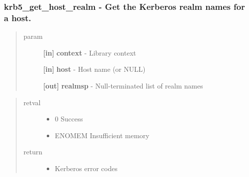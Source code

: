 \documentclass[letterpaper,10pt,english]{sphinxmanual}
\begin{document}
\subsubsection{krb5\_get\_host\_realm -  Get the Kerberos realm names for a host.}
\label{appdev/refs/api/krb5_get_host_realm:krb5-get-host-realm-get-the-kerberos-realm-names-for-a-host}\label{appdev/refs/api/krb5_get_host_realm::doc}

\begin{fulllineitems}
\label{appdev/refs/api/krb5_get_host_realm:krb5_get_host_realm}
\end{fulllineitems}

\begin{quote}\begin{description}
\item[{param}] \leavevmode
\textbf{{[}in{]}} \textbf{context} - Library context

\textbf{{[}in{]}} \textbf{host} - Host name (or NULL)

\textbf{{[}out{]}} \textbf{realmsp} - Null-terminated list of realm names

\end{description}\end{quote}
\begin{quote}\begin{description}
\item[{retval}] \leavevmode\begin{itemize}
\item {} 
0   Success

\item {} 
ENOMEM   Insufficient memory

\end{itemize}

\item[{return}] \leavevmode\begin{itemize}
\item {} 
Kerberos error codes

\end{itemize}

\end{description}\end{quote}
\end{document}
